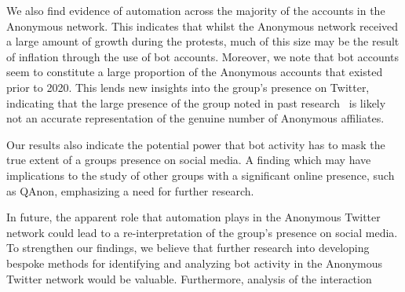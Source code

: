 \documentclass[letterpaper]{article}
\begin{document}
We also find evidence of automation across the majority of the accounts in the Anonymous network. This indicates that whilst the Anonymous network received a large amount of growth during the protests, much of this size may be the result of inflation through the use of bot accounts. Moreover, we note that bot accounts seem to constitute a large proportion of the Anonymous accounts that existed prior to 2020. This lends new insights into the group's presence on Twitter, indicating that the large presence of the group noted in past research~\cite{Jones2020} is likely not an accurate representation of the genuine number of Anonymous affiliates.

Our results also indicate the potential power that bot activity has to mask the true extent of a groups presence on social media. A finding which may have implications to the study of other groups with a significant online presence, such as QAnon, emphasizing a need for further research.

In future, the apparent role that automation plays in the Anonymous Twitter network could lead to a re-interpretation of the group's presence on social media. To strengthen our findings, we believe that further research into developing bespoke methods for identifying and analyzing bot activity in the Anonymous Twitter network would be valuable. Furthermore, analysis of the interaction


\fontsize{9.0pt}{10.0pt}
\selectfont
\clearpage

\end{document}
